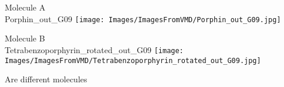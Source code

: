 \begin{multicols}{2}
\begin{center}
Molecule A \\ 
Porphin\_out\_G09
\texttt{[image: Images/ImagesFromVMD/Porphin\_out\_G09.jpg]}
\vtab

\columnbreak

Molecule B \\ 
Tetrabenzoporphyrin\_rotated\_out\_G09
\texttt{[image: Images/ImagesFromVMD/Tetrabenzoporphyrin\_rotated\_out\_G09.jpg]}
\vtab
\end{center}
\end{multicols}
\begin{center}
\vtab
\vtab
\textcolor{NavyBlue}{\large Are different molecules}
\end{center}
\newpage

